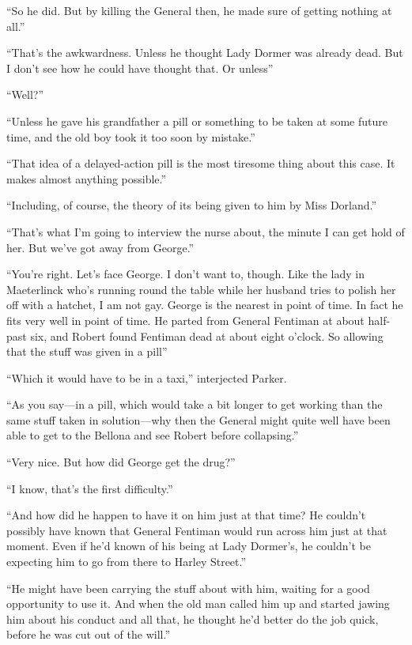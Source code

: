 \enquote{So he did. But by killing the General then, he made sure of getting nothing at all.}

\enquote{That's the awkwardness. Unless he thought Lady Dormer was already dead. But I don't see how he could have thought that. Or unless\longdash}

\enquote{Well?}

\enquote{Unless he gave his grandfather a pill or something to be taken at some future time, and the old boy took it too soon by mistake.}

\enquote{That idea of a delayed-action pill is the most tiresome thing about this case. It makes almost anything possible.}

\enquote{Including, of course, the theory of its being given to him by Miss Dorland.}

\enquote{That's what I'm going to interview the nurse about, the minute I can get hold of her. But we've got away from George.}

\enquote{You're right. Let's face George. I don't want to, though. Like the lady in Maeterlinck who's running round the table while her husband tries to polish her off with a hatchet, I am not gay. George is the nearest in point of time. In fact he fits very well in point of time. He parted from General Fentiman at about half-past six, and Robert found Fentiman dead at about eight o'clock. So allowing that the stuff was given in a pill\longdash}

\enquote{Which it would have to be in a taxi,} interjected Parker.

\enquote{As you say\allowbreak---\allowbreak in a pill, which would take a bit longer to get working than the same stuff taken in solution\allowbreak---\allowbreak why then the General might quite well have been able to get to the Bellona and see Robert before collapsing.}

\enquote{Very nice. But how did George get the drug?}

\enquote{I know, that's the first difficulty.}

\enquote{And how did he happen to have it on him just at that time? He couldn't possibly have known that General Fentiman would run across him just at that moment. Even if he'd known of his being at Lady Dormer's, he couldn't be expecting him to go from there to Harley Street.}

\enquote{He might have been carrying the stuff about with him, waiting for a good opportunity to use it. And when the old man called him up and started jawing him about his conduct and all that, he thought he'd better do the job quick, before he was cut out of the will.}

